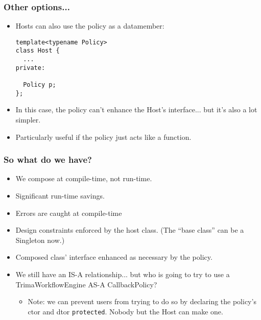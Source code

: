\begin{frame}[fragile,t]
\frametitle{Other options...}
\begin{itemize}[<+->]
\item Hosts can also use the policy as a datamember:
{\scriptsize\begin{verbatim}
template<typename Policy>
class Host {
  ...
private:

  Policy p;
};
\end{verbatim}
}
\item In this case, the policy can't enhance the Host's
  interface... but it's also a lot simpler.
\item Particularly useful if the policy just acts like a function.
\end{itemize}
\end{frame}


\begin{frame}[fragile,t]
\frametitle{So what do we have?}
\begin{itemize}[<+->]

\item We compose at compile-time, not run-time.
\item Significant run-time savings.
\item Errors are caught at compile-time
\item Design constraints enforced by the host class. (The ``base
  class'' can be a Singleton now.)
\item Composed class' interface enhanced as necessary by the policy.
\item We still have an IS-A relationship... but who is going to try to
  use a TrimaWorkflowEngine AS-A CallbackPolicy?
  \begin{itemize}
    \item Note: we can prevent users from trying to do so by declaring
      the policy's ctor and dtor \texttt{protected}.  Nobody but the
      Host can make one.
  \end{itemize}

\end{itemize}
\end{frame}
